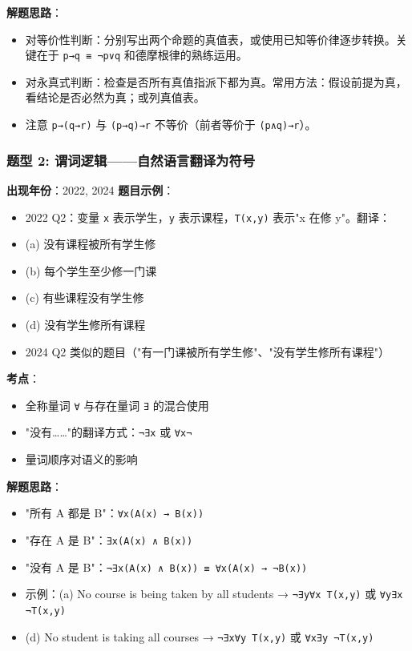 \documentclass[10pt,a4paper,openany]{ctexbook}
\theoremstyle{definition}
\theoremstyle{remark}
\begin{document}
\textbf{解题思路}：
\begin{itemize}
\item 对等价性判断：分别写出两个命题的真值表，或使用已知等价律逐步转换。关键在于 \texttt{p→q ≡ ¬p∨q} 和德摩根律的熟练运用。
\item 对永真式判断：检查是否所有真值指派下都为真。常用方法：假设前提为真，看结论是否必然为真；或列真值表。
\item 注意 \texttt{p→(q→r)} 与 \texttt{(p→q)→r} 不等价（前者等价于 \texttt{(p∧q)→r}）。

\end{itemize}

\vspace{-2pt}

\subsubsection{题型 2: 谓词逻辑——自然语言翻译为符号}

\textbf{出现年份}：2022, 2024
\textbf{题目示例}：
\begin{itemize}
\item 2022 Q2：变量 \texttt{x} 表示学生，\texttt{y} 表示课程，\texttt{T(x,y)} 表示"x 在修 y"。翻译：
\item (a) 没有课程被所有学生修
\item (b) 每个学生至少修一门课
\item (c) 有些课程没有学生修
\item (d) 没有学生修所有课程
\item 2024 Q2 类似的题目（"有一门课被所有学生修"、"没有学生修所有课程"）

\end{itemize}

\textbf{考点}：
\begin{itemize}
\item 全称量词 \texttt{∀} 与存在量词 \texttt{∃} 的混合使用
\item "没有……"的翻译方式：\texttt{¬∃x} 或 \texttt{∀x¬}
\item 量词顺序对语义的影响

\end{itemize}

\textbf{解题思路}：
\begin{itemize}
\item "所有 A 都是 B"：\texttt{∀x(A(x) → B(x))}
\item "存在 A 是 B"：\texttt{∃x(A(x) ∧ B(x))}
\item "没有 A 是 B"：\texttt{¬∃x(A(x) ∧ B(x)) ≡ ∀x(A(x) → ¬B(x))}
\item 示例：(a) No course is being taken by all students → \texttt{¬∃y∀x T(x,y)} 或 \texttt{∀y∃x ¬T(x,y)}
\item (d) No student is taking all courses → \texttt{¬∃x∀y T(x,y)} 或 \texttt{∀x∃y ¬T(x,y)}

\end{itemize}
\end{document}
